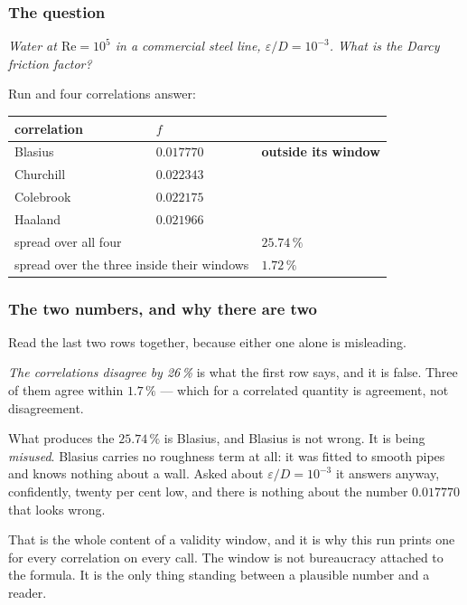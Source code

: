 \documentclass[11pt,a4paper]{article}
\begin{document}

\subsubsection*{The question}

\emph{Water at $\mathrm{Re} = 10^{5}$ in a commercial steel line,
$\varepsilon/D = 10^{-3}$.  What is the Darcy friction factor?}

Run  and
four correlations answer:

\begin{center}
\begin{tabular}{lll}
\toprule
correlation & $f$ & \\
\midrule
Blasius     & $0.017770$ & \textbf{outside its window} \\
Churchill   & $0.022343$ & \\
Colebrook   & $0.022175$ & \\
Haaland     & $0.021966$ & \\
\midrule
\multicolumn{2}{l}{spread over all four} & $25.74\,\%$ \\
\multicolumn{2}{l}{spread over the three inside their windows} & $1.72\,\%$ \\
\bottomrule
\end{tabular}
\end{center}

\subsubsection*{The two numbers, and why there are two}

Read the last two rows together, because either one alone is misleading.

\emph{The correlations disagree by 26\,\%} is what the first row says, and
it is false.  Three of them agree within $1.7\,\%$ --- which for a
correlated quantity is agreement, not disagreement.

What produces the $25.74\,\%$ is Blasius, and Blasius is not wrong.  It is
being \emph{misused}.  Blasius carries no roughness term at all: it was
fitted to smooth pipes and knows nothing about a wall.  Asked about
$\varepsilon/D = 10^{-3}$ it answers anyway, confidently, twenty per cent
low, and there is nothing about the number $0.017770$ that looks wrong.

That is the whole content of a validity window, and it is why this run
prints one for every correlation on every call.  The window is not
bureaucracy attached to the formula.  It is the only thing standing
between a plausible number and a reader.
\end{document}
